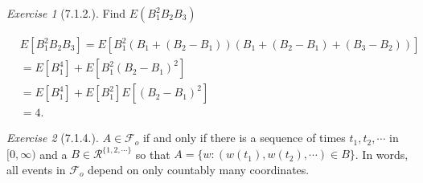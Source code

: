 \documentclass[12pt,a4paper]{amsart}
\theoremstyle{plain}
\theoremstyle{definition}
\theoremstyle{remark}
\newtheorem*{exe}{Exercise}
\numberwithin{equation}{section}
\begin{document}
\begin{exe}[7.1.2.]
Find $E(B_1^2 B_2 B_3)$
\end{exe}
\begin{align}
&E [ B_1^2 B_2 B_3] 
  = E\left[ B_1^2 \left(B_1 + \left(B_2 - B_1\right)\right) \left( B_1 + \left( B_2 - B_1 \right) +\left( B_3 - B_2 \right) \right)\right]
  \\&= E[B_1^4] + E\left[ B_1^2 \left( B_2 - B_1 \right)^2\right]
  \\& = E[B_1^4] + E[B_1^2] E\left[ \left( B_2 - B_1 \right)^2 \right]
\\& = 4.
\end{align}
\begin{exe}[7.1.4.]
$A \in \mathcal F_o$ if and only if there is a sequence of times $t_1, t_2, \cdots$ in $[0,\infty)$ and a $B \in \mathcal R^{\{1,2,\cdots\}}$ so that $A = \{w: (w(t_1), w(t_2),\cdots) \in B\}$.
In words, all events in $\mathcal F_o$ depend on only countably many coordinates.
\end{exe}
\end{document}

